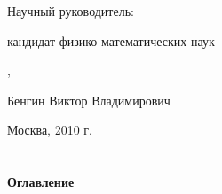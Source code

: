 \documentclass[a4paper,portrait,12pt]{article}
\begin{document}
\begin{center}
{\large Научный руководитель:}
\end{center}


\begin{center}
\hypertarget{OLE_LINK59}{\hypertarget{OLE_LINK60}{{\large кандидат физико-математических наук}}}{\large ,}
\end{center}


\begin{center}
\hypertarget{OLE_LINK57}{\hypertarget{OLE_LINK58}{{\large Бенгин Виктор Владимирович}}}{\large  }
\end{center}


\begin{center}

\end{center}





\begin{center}
\colorbox[rgb]{1.000,1.000,0.000}{{\large Москва, 2010 г.}}
\end{center}


\section*{}



\setlength{\oddsidemargin}{0.5903in-1in}
\setlength{\textwidth}{\paperwidth - 1.1812in-0.5903in}

\textbf{{\large \newpage
}}


\section*{}

\textbf{{\large Оглавление}}







\tableofcontents 















\setlength{\oddsidemargin}{0.5903in-1in}
\setlength{\textwidth}{\paperwidth - 1.1812in-0.5903in}

\newpage
\end{document}
